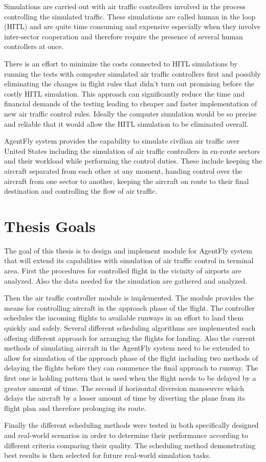 Simulations are carried out with air traffic controllers involved in the process controlling the simulated traffic. These simulations are called human in the loop (HITL) and are quite time consuming and expensive especially when they involve inter-sector cooperation and therefore require the presence of several human controllers at once.

There is an effort to minimize the costs connected to HITL simulations by running the tests with computer simulated air traffic controllers first and possibly eliminating the changes in flight rules that didn't turn out promising before the costly HITL simulation. This approach can significantly reduce the time and financial demands of the testing leading to cheaper and faster implementation of new air traffic control rules. Ideally the computer simulation would be so precise and reliable that it would allow the HITL simulation to be eliminated overall.

AgentFly system provides the capability to simulate civilian air traffic over United States including the simulation of air traffic controllers in en-route sectors and their workload while performing the control duties. These include keeping the aircraft separated from each other at any moment, handing control over the aircraft from one sector to another, keeping the aircraft on route to their final destination and controlling the flow of air traffic.

\section{Thesis Goals}

The goal of this thesis is to design and implement module for AgentFly system that will extend its capabilities with simulation of air traffic control in terminal area. First the procedures for controlled flight in the vicinity of airports are analyzed. Also the data needed for the simulation are gathered and analyzed.

Then the air traffic controller module is implemented. The module provides the means for controlling aircraft in the approach phase of the flight. The controller schedules the incoming flights to available runways in an effort to land them quickly and safely. Several different scheduling algorithms are implemented each offering different approach for arranging the flights for landing. Also the current methods of simulating aircraft in the AgentFly system need to be extended to allow for simulation of the approach phase of the flight including two methods of delaying the flights before they can commence the final approach to runway. The first one is holding pattern that is used when the flight needs to be delayed by a greater amount of time. The second if horizontal diversion manoeuvre which delays the aircraft by a lesser amount of time by diverting the plane from its flight plan and therefore prolonging its route.

Finally the different scheduling methods were tested in both specifically designed and real-world scenarios in order to determine their performance according to different criteria comparing their quality. The scheduling method demonstrating best results is then selected for future real-world simulation tasks.